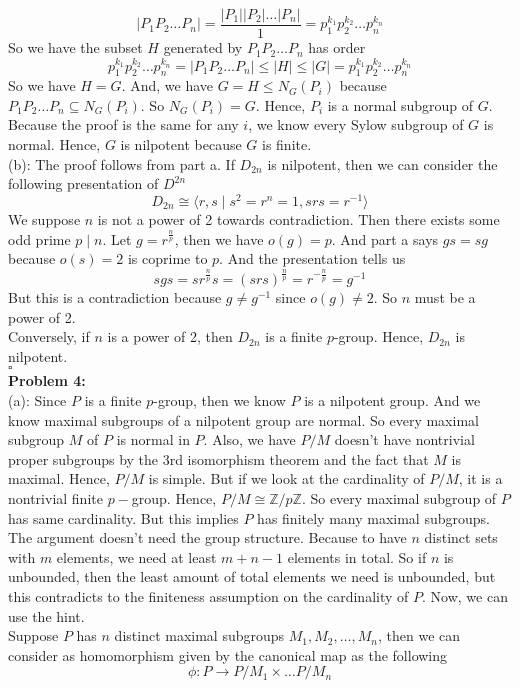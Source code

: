\documentclass[12pt]{amsart}
\newcommand{\Z}{\mathbb{Z}}
\begin{document}
\[|P_1P_2\dots P_n|=\frac{|P_1||P_2|\dots|P_n|}{1}=p_1^{k_1}p_2^{k_2}\dots p_n^{k_n}\]
So we have the subset $H$ generated by $P_1P_2\dots P_n$ has order 
\[p_1^{k_1}p_2^{k_2}\dots p_n^{k_n}=|P_1P_2\dots P_n|\leq |H|\leq |G|=p_1^{k_1}p_2^{k_2}\dots p_n^{k_n}\]
So we have $H=G$. And, we have $G=H\leq N_G(P_i)$ because $P_1P_2\dots P_n\subseteq N_G(P_i)$. So $N_G(P_i)=G$. Hence, $P_i$ is a normal subgroup of $G$. Because the proof is the same for any $i$, we know every Sylow subgroup of $G$ is normal. Hence, $G$ is nilpotent because $G$ is finite.\\
(b): The proof follows from part a. If $D_{2n}$ is nilpotent, then we can consider the following presentation of $D^{2n}$
\[D_{2n}\cong\langle r,s\mid s^2=r^n=1, srs=r^{-1}\rangle \]
We suppose $n$ is not a power of 2 towards contradiction. Then there exists some odd prime $p\mid n$. Let $g=r^{\frac{n}{p}}$, then we have $o(g)=p$. And part a says $gs=sg$ because $o(s)=2$ is coprime to $p$. And the presentation tells us 
\[sgs=sr^{\frac{n}{p}}s=(srs)^{\frac{n}{p}}=r^{-\frac{n}{p}}=g^{-1}\]
But this is a contradiction because $g\neq g^{-1}$ since $o(g)\neq 2$. So $n$ must be a power of 2.\\
Conversely, if $n$ is a power of 2, then $D_{2n}$ is a finite $p$-group. Hence, $D_{2n}$ is nilpotent.
\\\phantom{qed}\hfill$\square$\\
\textbf{Problem 4:}\\
(a): Since $P$ is a finite $p$-group, then we know $P$ is a nilpotent group. And we know maximal subgroups of a nilpotent group are normal. So every maximal subgroup $M$ of $P$ is normal in $P$. Also, we have $P/M$ doesn't have nontrivial proper subgroups by the 3rd isomorphism theorem and the fact that $M$ is maximal. Hence, $P/M$ is simple. But if we look at the cardinality of $P/M$, it is a nontrivial finite $p-$group. Hence, $P/M\cong \Z/p\Z$. So every maximal subgroup of $P$ has same cardinality. But this implies $P$ has finitely many maximal subgroups. The argument doesn't need the group structure. Because to have $n$ distinct sets with $m$ elements, we need at least $m+n-1$ elements in total. So if $n$ is unbounded, then the least amount of total elements we need is unbounded, but this contradicts to the finiteness assumption on the cardinality of $P$. Now, we can use the hint.\\
Suppose $P$ has $n$ distinct maximal subgroups $M_1,M_2,\dots,M_n$, then we can consider as homomorphism given by the canonical map as the following
\[\phi:P\to P/M_1\times \dots P/M_n \]
\end{document}
